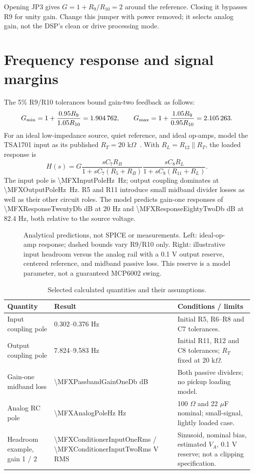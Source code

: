 \documentclass[a4paper,10pt]{article}
\newcommand{\nextsection}[1]{\clearpage\section{#1}}
\newcommand{\calc}[1]{\num[round-precision=3]{#1}}
\begin{document}
Opening JP3 gives $G=1+R_9/R_{10}=2$ around the reference. Closing it bypasses R9 for unity gain. Change this jumper with power removed; it selects analog gain, not the DSP's clean or drive processing mode.

\nextsection{Frequency response and signal margins}
\label{sec:response}
The 5\% R9/R10 tolerances bound gain-two feedback as follows:
\begin{equation}
G_{\min}=1+\frac{0.95R_9}{1.05R_{10}}=\calc{\MFXGainTwoMin},\qquad
G_{\max}=1+\frac{1.05R_9}{0.95R_{10}}=\calc{\MFXGainTwoMax}.
\end{equation}
For an ideal low-impedance source, quiet reference, and ideal op-amps, model the TSA1701 input as its published $R_T=20$ k$\Omega$~\cite{tsa}. With $R_L=R_{12}\parallel R_T$, the loaded response is
\begin{equation}
H(s)=G\frac{sC_7R_B}{1+sC_7(R_5+R_B)}
        \frac{sC_8R_L}{1+sC_8(R_{11}+R_L)}.\label{eq:response}
\end{equation}
The input pole is \SI{\MFXInputPoleHz}{\hertz}; output coupling dominates at \SI{\MFXOutputPoleHz}{\hertz}. R5 and R11 introduce small midband divider losses as well as their other circuit roles. The model predicts gain-one responses of \calc{\MFXResponseTwentyDb} dB at 20 Hz and \calc{\MFXResponseEightyTwoDb} dB at 82.4 Hz, both relative to the source voltage.

\begin{figure}[H]\centering\MFXResponsePlots
\caption{Analytical predictions, not SPICE or measurements. Left: ideal-op-amp response; dashed bounds vary R9/R10 only. Right: illustrative input headroom versus the analog rail with a 0.1 V output reserve, centered reference, and midband passive loss. This reserve is a model parameter, not a guaranteed MCP6002 swing.}\label{fig:response}
\end{figure}

\begin{table}[H]\centering\small
\caption{Selected calculated quantities and their assumptions.}\label{tab:calcs}
\begin{tabularx}{\linewidth}{P{43mm}P{35mm}Y}\toprule
Quantity & Result & Conditions / limits\\\midrule
Input coupling pole & 0.302--0.376 Hz & Initial R5, R6--R8 and C7 tolerances.\\
Output coupling pole & 7.824--9.583 Hz & Initial R11, R12 and C8 tolerances; $R_T$ fixed at 20 k$\Omega$.\\
Gain-one midband loss & \calc{\MFXPassbandGainOneDb} dB & Both passive dividers; no pickup loading model.\\
Analog RC pole & \calc{\MFXAnalogPoleHz} Hz & 100 $\Omega$ and 22 $\mu$F nominal; small-signal, lightly loaded case.\\
Headroom example, gain 1 / 2 & \calc{\MFXConditionerInputOneRms} / \calc{\MFXConditionerInputTwoRms} V RMS & Sinusoid, nominal bias, estimated $V_A$, 0.1 V reserve; not a clipping specification.\\\bottomrule
\end{tabularx}
\end{table}
\end{document}
